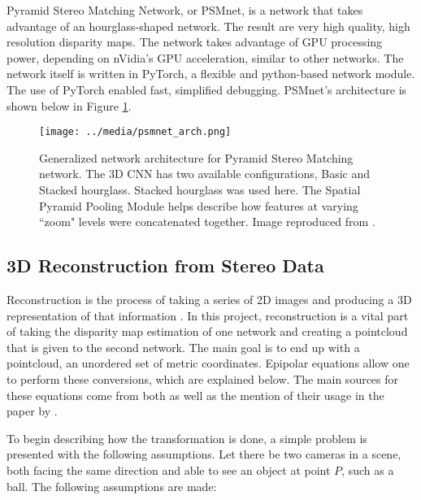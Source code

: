 Pyramid Stereo Matching Network, or PSMnet, is a network that takes advantage of an hourglass-shaped network. The result are very high quality, high resolution disparity maps. The network takes advantage of GPU processing power, depending on nVidia's GPU acceleration, similar to other networks. The network itself is written in PyTorch, a flexible and python-based network module. The use of PyTorch enabled fast, simplified debugging. PSMnet's architecture is shown below in Figure \ref{psmnet_arch}.


\begin{figure}[ht]
	\texttt{[image: ../media/psmnet\_arch.png]}
	\caption{Generalized network architecture for Pyramid Stereo Matching network. The 3D CNN has two available configurations, Basic and Stacked hourglass. Stacked hourglass was used here. The Spatial Pyramid Pooling Module helps describe how features at varying ``zoom" levels were concatenated together. Image reproduced from \cite{chang_pyramid_2018}.}
	\label{psmnet_arch}
\end{figure}

\subsection{3D Reconstruction from Stereo Data}
\label{sect_reconstruct}
Reconstruction is the process of taking a series of 2D images and producing a 3D representation of that information \cite{szeliski_computer_2010}. In this project, reconstruction is a vital part of taking the disparity map estimation of one network and creating a pointcloud that is given to the second network. The main goal is to end up with a pointcloud, an unordered set of metric coordinates. Epipolar equations allow one to perform these conversions, which are explained below. The main sources for these equations come from both \cite{szeliski_computer_2010} as well as the mention of their usage in the paper by \cite{wang_pseudo-lidar_2019}. 

To begin describing how the transformation is done, a simple problem is presented with the following assumptions. Let there be two cameras in a scene, both facing the same direction and able to see an object at point $P$, such as a ball. The following assumptions are made: 


